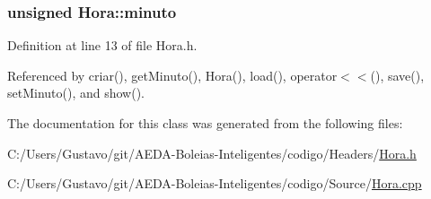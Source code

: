 \hypertarget{class_hora_a9d33ce2d8a3f4b3d05b2a3c6df782fa4}{
\subsubsection[{minuto}]{\setlength{\rightskip}{0pt plus 5cm}unsigned Hora\+::minuto\hspace{0.3cm}{\ttfamily [private]}}}\label{class_hora_a9d33ce2d8a3f4b3d05b2a3c6df782fa4}


Definition at line 13 of file Hora.\+h.



Referenced by criar(), get\+Minuto(), Hora(), load(), operator$<$$<$(), save(), set\+Minuto(), and show().



The documentation for this class was generated from the following files\+:\begin{DoxyCompactItemize}
\item 
C\+:/\+Users/\+Gustavo/git/\+A\+E\+D\+A-\/\+Boleias-\/\+Inteligentes/codigo/\+Headers/\hyperlink{_hora_8h}{Hora.\+h}\item 
C\+:/\+Users/\+Gustavo/git/\+A\+E\+D\+A-\/\+Boleias-\/\+Inteligentes/codigo/\+Source/\hyperlink{_hora_8cpp}{Hora.\+cpp}\end{DoxyCompactItemize}
